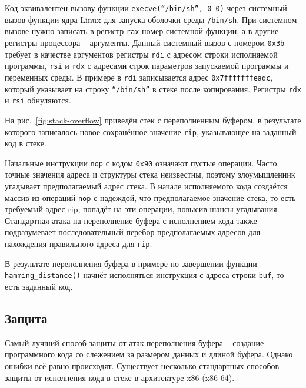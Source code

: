 Код эквивалентен вызову функции \texttt{execve(``/bin/sh'', 0 0)} через системный вызов функции ядра Linux для запуска оболочки среды \texttt{/bin/sh}. При системном вызове нужно записать в регистр \texttt{rax} номер системной функции, а в другие регистры процессора -- аргументы. Данный системный вызов с номером \texttt{0x3b} требует в качестве аргументов регистры \texttt{rdi} с адресом строки исполняемой программы, \texttt{rsi} и \texttt{rdx} с адресами строк параметров запускаемой программы и переменных среды. В примере в \texttt{rdi} записывается адрес \texttt{0x7fffffffeadc}, который указывает на строку \texttt{``/bin/sh''} в стеке после копирования. Регистры \texttt{rdx} и \texttt{rsi} обнуляются.

На рис.~\ref{fig:stack-overflow} приведён стек с переполненным буфером, в результате которого записалось новое сохранённое значение \texttt{rip}, указывающее на заданный код в стеке.

Начальные инструкции \texttt{nop} с кодом \texttt{0x90} означают пустые операции. Часто точные значения адреса и структуры стека неизвестны, поэтому злоумышленник угадывает предполагаемый адрес стека. В начале исполняемого кода создаётся массив из операций \texttt{nop} с надеждой, что предполагаемое значение стека, то есть требуемый адрес rip, попадёт на эти операции, повысив шансы угадывания. Стандартная атака на переполнение буфера с исполнением кода также подразумевает последовательный перебор предполагаемых адресов для нахождения правильного адреса для \texttt{rip}.

В результате переполнения буфера в примере по завершении функции \texttt{hamming\_distance()} начнёт исполняться инструкция с адреса строки \texttt{buf}, то есть заданный код.


\subsection{Защита}

Самый лучший способ защиты от атак переполнения буфера -- создание программного кода со слежением за размером данных и длиной буфера. Однако ошибки всё равно происходят. Существует несколько стандартных способов защиты от исполнения кода в стеке в архитектуре x86 (x86-64).

